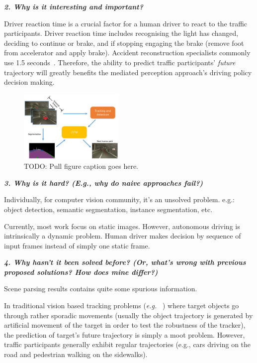 \documentclass[10pt,twocolumn,letterpaper]{article}
\begin{document}
\textbf{\emph{2. Why is it interesting and important?}}

Driver reaction time is a crucial factor for a human driver to react to the traffic participants. Driver reaction time includes recognising the light has changed, deciding to continue or brake, and if stopping engaging the brake (remove foot from accelerator and apply brake). Accident reconstruction specialists commonly use 1.5 seconds~\cite{mcgehee2000driver}.
Therefore, the ability to predict traffic participants' \emph{future} trajectory will greatly benefits the mediated perception approach's driving policy decision making.

\begin{figure}[t]
        \centering
        \includegraphics[width=0.45\textwidth]{figures/pull_figure.pdf}
        \caption{ {\small TODO: Pull figure caption goes here.}}
        \label{fig:response_map}
\end{figure}
\textbf{\emph{3. Why is it hard? (E.g., why do naive approaches fail?)}}

Individually, for computer vision community, it's an unsolved problem. e.g.: object detection, semantic segmentation, instance segmentation, etc.


Currently, most work focus on static images. However, autonomous driving is intrinsically a dynamic problem. Human driver makes decision by sequence of input frames instead of simply one static frame.

\textbf{\emph{4. Why hasn't it been solved before? (Or, what's wrong with previous proposed solutions? How does mine differ?)}}

Scene parsing results contains quite some spurious information.

In traditional vision based tracking problems (\emph{e.g.} ~\cite{wu2013online, wu2015object, mueller2016benchmark}) where target objects go through rather sporadic movements (usually the object trajectory is generated by artificial movement of the target in order to test the robustness of the tracker), the prediction of target's future trajectory is simply a moot problem.
However, traffic participants generally exhibit regular trajectories (e.g., cars driving on the road and pedestrian walking on the sidewalks).
\end{document}

